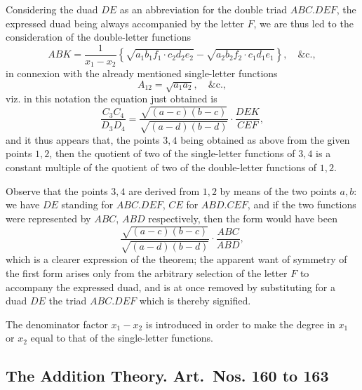 \documentclass[11pt,a4paper]{book}
\begin{document}
\begin{art}
Considering the duad $DE$ as an abbreviation for the double triad $ABC.DEF$, the expressed duad being always accompanied by the letter $F$, we are thus led to the consideration of the double-letter functions
\[
ABK = \frac{1}{x_1-x_2}\left\{\sqrt{a_1b_1f_1 \cdot c_2d_2e_2} - \sqrt{a_2b_2f_2 \cdot c_1d_1e_1}\right\}, \quad \text{\&c.},
\]
in connexion with the already mentioned single-letter functions
\[
A_{12} = \sqrt{a_1a_2}, \quad \text{\&c.},
\]
viz. in this notation the equation just obtained is
\[
\frac{C_3C_4}{D_3D_4} = \frac{\sqrt{(a-c)(b-c)}}{\sqrt{(a-d)(b-d)}} \cdot \frac{DEK}{CEF},
\]
and it thus appears that, the points $3,4$ being obtained as above from the given points $1,2$, then the quotient of two of the single-letter functions of $3,4$ is a constant multiple of the quotient of two of the double-letter functions of $1,2$.

Observe that the points $3,4$ are derived from $1,2$ by means of the two points $a,b$: we have $DE$ standing for $ABC.DEF$, $CE$ for $ABD.CEF$, and if the two functions were represented by $ABC$, $ABD$ respectively, then the form would have been
\[
\frac{\sqrt{(a-c)(b-c)}}{\sqrt{(a-d)(b-d)}} \cdot \frac{ABC}{ABD},
\]
which is a clearer expression of the theorem; the apparent want of symmetry of the first form arises only from the arbitrary selection of the letter $F$ to accompany the expressed duad, and is at once removed by substituting for a duad $DE$ the triad $ABC.DEF$ which is thereby signified.

The denominator factor $x_1-x_2$ is introduced in order to make the degree in $x_1$ or $x_2$ equal to that of the single-letter functions.
\end{art}

\newpage
\subsection*{The Addition Theory. Art.~Nos. 160 to 163}
\end{document}
